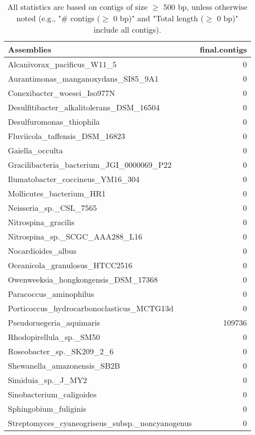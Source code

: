 \documentclass[12pt,a4paper]{article}
\begin{document}
\begin{table}[ht]
\begin{center}
\caption{All statistics are based on contigs of size $\geq$ 500 bp, unless otherwise noted (e.g., "\# contigs ($\geq$ 0 bp)" and "Total length ($\geq$ 0 bp)" include all contigs).}
\begin{tabular}{|l*{1}{|r}|}
\hline
Assemblies & final.contigs \\ \hline
Alcanivorax\_pacificus\_W11\_5 & 0 \\ \hline
Aurantimonas\_manganoxydans\_SI85\_9A1 & 0 \\ \hline
Conexibacter\_woesei\_Iso977N & 0 \\ \hline
Desulfitibacter\_alkalitolerans\_DSM\_16504 & 0 \\ \hline
Desulfuromonas\_thiophila & 0 \\ \hline
Fluviicola\_taffensis\_DSM\_16823 & 0 \\ \hline
Gaiella\_occulta & 0 \\ \hline
Gracilibacteria\_bacterium\_JGI\_0000069\_P22 & 0 \\ \hline
Ilumatobacter\_coccineus\_YM16\_304 & 0 \\ \hline
Mollicutes\_bacterium\_HR1 & 0 \\ \hline
Neisseria\_sp.\_CSL\_7565 & 0 \\ \hline
Nitrospina\_gracilis & 0 \\ \hline
Nitrospina\_sp.\_SCGC\_AAA288\_L16 & 0 \\ \hline
Nocardioides\_albus & 0 \\ \hline
Oceanicola\_granulosus\_HTCC2516 & 0 \\ \hline
Owenweeksia\_hongkongensis\_DSM\_17368 & 0 \\ \hline
Paracoccus\_aminophilus & 0 \\ \hline
Porticoccus\_hydrocarbonoclasticus\_MCTG13d & 0 \\ \hline
Pseudoruegeria\_aquimaris & 109736 \\ \hline
Rhodopirellula\_sp.\_SM50 & 0 \\ \hline
Roseobacter\_sp.\_SK209\_2\_6 & 0 \\ \hline
Shewanella\_amazonensis\_SB2B & 0 \\ \hline
Simiduia\_sp.\_J\_MY2 & 0 \\ \hline
Sinobacterium\_caligoides & 0 \\ \hline
Sphingobium\_fuliginis & 0 \\ \hline
Streptomyces\_cyaneogriseus\_subsp.\_noncyanogenus & 0 \\ \hline

\end{tabular}
\end{center}
\end{table}
\end{document}
